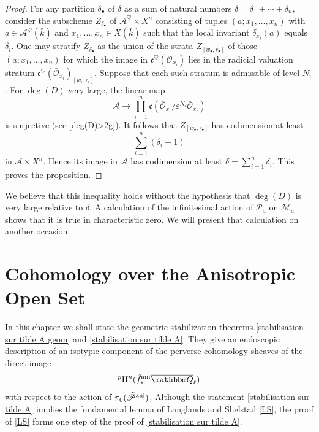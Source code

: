 \documentclass[12pt,english]{smfart}
\numberwithin{equation}{subsection}
\theoremstyle{remark}
\newcommand\calP{{\mathscr P}}
\newcommand\QQ{{\mathbbm Q}}
\newcommand\rmH{{\rm H}}
\newcommand\ani{{\rm ani}}
\newcommand\Ql{{\overline\QQ_\ell}}
\begin{document}
\begin{proof}
For any partition $\delta_\bullet$ of $\delta$ as a sum of natural numbers $\delta=\delta_1+\cdots+\delta_n$, consider the subscheme $Z_{\delta_\bullet}$ of $\mathcal{A}^\heartsuit\times X^n$ consisting of tuples $(a;x_1,\ldots,x_n)$ with $a\in\mathcal{A}^\heartsuit(\bar{k})$ and $x_1,\ldots,x_n\in X(\bar{k})$ such that the local invariant $\delta_{x_i}(a)$ equals $\delta_i$. One may stratify $Z_{\delta_\bullet}$ as the union of the strata $Z_{[w_\bullet,r_\bullet]}$ of those $(a;x_1,\ldots,x_n)$ for which the image in $\mathfrak{c}^\heartsuit(\bar{\mathcal{O}}_{x_i})$ lies in the radicial valuation stratum $\mathfrak{c}^\heartsuit(\bar{\mathcal{O}}_{x_i})_{[w_i,r_i]}$. Suppose that each such stratum is admissible of level $N_i$. For $\deg(D)$ very large, the linear map
$$\mathcal{A}\longrightarrow \prod_{i=1}^n\mathfrak{c}(\bar{\mathcal{O}}_{x_i}/\varepsilon^{N_i}\bar{\mathcal{O}}_{x_i})$$
is surjective (see \ref{deg(D)>2g}). It follows that $Z_{[w_\bullet,r_\bullet]}$ has codimension at least 
$$\sum_{i=1}^n(\delta_i+1)$$
in $\mathcal{A}\times X^n$. Hence its image in $\mathcal{A}$ has codimension at least $\delta=\sum_{i=1}^n\delta_i$. This proves the proposition.
\end{proof}

We believe that this inequality holds without the hypothesis that $\deg(D)$ is very large relative to $\delta$. A calculation of the infinitesimal action of $\mathcal{P}_a$ on $\mathcal{M}_a$ shows that it is true in characteristic zero. We will present that calculation on another occasion.

\section{Cohomology over the Anisotropic Open Set}
\label{section : anisotrope}

In this chapter we shall state the geometric stabilization theorems \ref{stabilisation sur tilde A geom} and \ref{stabilisation sur tilde A}. They give an endoscopic description of an isotypic component of the perverse cohomology sheaves of the direct image
$${}^p\rmH^n(\tilde f^\ani_*\Ql)$$
with respect to the action of $\pi_0(\tilde\calP^\ani)$. Although the statement \ref{stabilisation sur tilde A} implies the fundamental lemma of Langlands and Shelstad \ref{LS}, the proof of \ref{LS} forms one step of the proof of \ref{stabilisation sur tilde A}.
\end{document}
